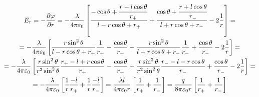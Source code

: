 \[
	\begin{gathered}
	E_r = - \frac{\partial \varphi}{\partial r} = 
	- \frac{\lambda}{4\pi\varepsilon_0} 
	\left[
	\frac{- \cos \theta + \cfrac{r - l \cos \theta}{r_+}}{l - r \cos \theta + r_+} 
	+
	\frac{\cos \theta + \cfrac{r + l \cos \theta}{r_-}}{l + r \cos \theta + r_-} 
	-
	2 \frac{1}{r}
	\right] 
	= \\ =
	- \frac{\lambda}{4\pi\varepsilon_0} 
	\left[
	\frac{r \sin^2 \theta}{l - r \cos \theta + r_+} \frac{1}{r_+} - \frac{\cos \theta}{r_+}
	+
	\frac{r \sin^2 \theta}{l + r \cos \theta + r_-} \frac{1}{r_-} + \frac{\cos \theta}{r_-}
	-
	2 \frac{1}{r}
	\right] 
	= \\ =
	- \frac{\lambda}{4\pi\varepsilon_0} 
	\left[
	\frac{r \sin^2 \theta}{r^2 \sin^2 \theta} \frac{r_+ - l + r \cos \theta}{r_+} - \frac{\cos \theta}{r_+}
	+
	\frac{r \sin^2 \theta}{r^2 \sin^2 \theta} \frac{r_- - l - r \cos \theta}{r_-} + \frac{\cos \theta}{r_-}
	-
	2 \frac{1}{r}
	\right] 
	= \\ =
	- \frac{\lambda}{4\pi\varepsilon_0} 
	\left[
	\frac{1}{r} \frac{- l}{r_+}
	+
	\frac{1}{r} \frac{- l}{r_-}
	\right]
	= 
	\frac{\lambda l}{4\pi\varepsilon_0 r} 
	\left[
	\frac{1}{r_+}
	+
	\frac{1}{r_-}
	\right]
	=
	\frac{q}{8\pi\varepsilon_0 r} 
	\left[
	\frac{1}{r_+}
	+
	\frac{1}{r_-}
	\right]
	\end{gathered}
\]

